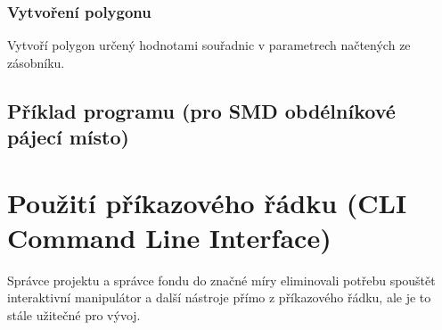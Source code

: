 \documentclass[letterpaper,10pt,czech]{sphinxmanual}
\begin{document}
\subsection{Vytvoření polygonu}
\label{\detokenize{parameter-programs_cz:vytvoreni-polygonu}}
Vytvoří polygon určený hodnotami souřadnic v parametrech načtených ze zásobníku.


\section{Příklad programu (pro SMD obdélníkové pájecí místo)}
\label{\detokenize{parameter-programs_cz:priklad-programu-pro-smd-obdelnikove-pajeci-misto}}
\begin{sphinxVerbatim}[commandchars=\\\{\}]
 \PYG{p}{[}  \PYG{p}{]}
 \PYG{p}{[}  \PYG{p}{]}
 
 \PYG{p}{[}   \PYG{p}{]}
 \PYG{p}{[}  \PYG{p}{]}
 
 \PYG{p}{[}   \PYG{p}{]}

 \PYG{p}{[}  \PYG{p}{]}
 
 \PYG{p}{[}   \PYG{p}{]}
\end{sphinxVerbatim}


\chapter{Použití příkazového řádku (CLI Command Line Interface)}
\label{\detokenize{cli-usage_cz:pouziti-prikazoveho-radku-cli-command-line-interface}}\label{\detokenize{cli-usage_cz::doc}}
Správce projektu a správce fondu do značné míry eliminovali potřebu
spouštět interaktivní manipulátor a další nástroje přímo z příkazového řádku,
ale je to stále užitečné pro vývoj.
\end{document}
